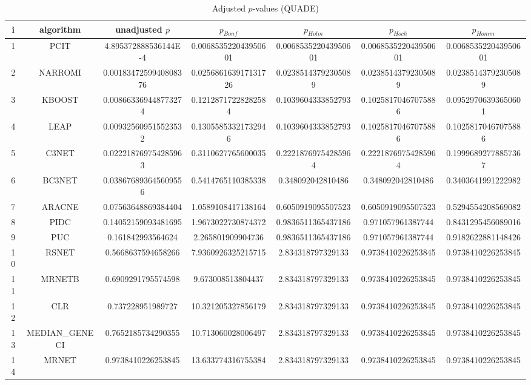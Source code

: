 \documentclass[a4paper,10pt]{article}
\begin{document}
\begin{landscape}
\begin{table}[!htp]
\centering\scriptsize
\caption{Adjusted $p$-values (QUADE)}
\begin{tabular}{ccccccc}
i&algorithm&unadjusted $p$&$p_{Bonf}$&$p_{Holm}$&$p_{Hoch}$&$p_{Homm}$\\
\hline
1&PCIT&4.895372888536144E-4&0.006853522043950601&0.006853522043950601&0.006853522043950601&0.006853522043950601\\
2&NARROMI&0.0018347259940808376&0.025686163917131726&0.02385143792305089&0.02385143792305089&0.02385143792305089\\
3&KBOOST&0.008663369448773274&0.12128717228282584&0.1039604333852793&0.10258170467075886&0.09529706393650601\\
4&LEAP&0.009325609515523532&0.13055853321732946&0.1039604333852793&0.10258170467075886&0.10258170467075886\\
5&C3NET&0.022218769754285963&0.3110627765600035&0.22218769754285964&0.22218769754285964&0.19996892778857367\\
6&BC3NET&0.038676893645609556&0.5414765110385338&0.348092042810486&0.348092042810486&0.3403641991222982\\
7&ARACNE&0.07563648869384404&1.0589108417138164&0.6050919095507523&0.6050919095507523&0.5294554208569082\\
8&PIDC&0.14052159093481695&1.9673022730874372&0.9836511365437186&0.971057961387744&0.8431295456089016\\
9&PUC&0.161842993564624&2.265801909904736&0.9836511365437186&0.971057961387744&0.9182622881148426\\
10&RSNET&0.5668637594658266&7.9360926325215715&2.834318797329133&0.9738410226253845&0.9738410226253845\\
11&MRNETB&0.6909291795574598&9.673008513804437&2.834318797329133&0.9738410226253845&0.9738410226253845\\
12&CLR&0.737228951989727&10.321205327856179&2.834318797329133&0.9738410226253845&0.9738410226253845\\
13&MEDIAN_GENECI&0.7652185734290355&10.713060028006497&2.834318797329133&0.9738410226253845&0.9738410226253845\\
14&MRNET&0.9738410226253845&13.633774316755384&2.834318797329133&0.9738410226253845&0.9738410226253845\\
\hline
\end{tabular}
\end{table}


\end{landscape}
\end{document}
